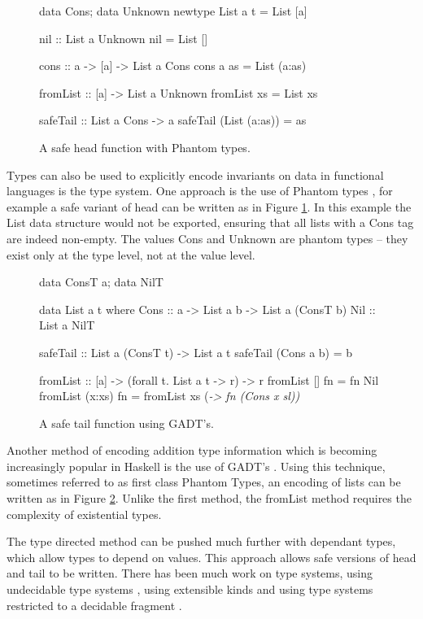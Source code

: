 \documentclass[preprint]{sigplanconf}
\newcommand{\C}[1]{\textsf{#1}}
\begin{document}
\begin{figure}
\begin{code}
data Cons; data Unknown
newtype List a t = List [a]

nil :: List a Unknown
nil = List []

cons :: a -> [a] -> List a Cons
cons a as = List (a:as)

fromList :: [a] -> List a Unknown
fromList xs = List xs

safeTail :: List a Cons -> a
safeTail (List (a:as)) = as
\end{code}
\caption{A safe \C{head} function with Phantom types.}
\label{fig:phantom}
\end{figure}

Types can also be used to explicitly encode invariants on data in functional languages is the type system. One approach is the use of Phantom types \citep{fluet:phantom}, for example a safe variant of \C{head} can be written as in Figure \ref{fig:phantom}. In this example the \C{List} data structure would not be exported, ensuring that all lists with a \C{Cons} tag are indeed non-empty. The values \C{Cons} and \C{Unknown} are phantom types -- they exist only at the type level, not at the value level.

\begin{figure}
\begin{code}
data ConsT a; data NilT

data List a t where
    Cons  :: a -> List a b -> List a (ConsT b)
    Nil   :: List a NilT

safeTail :: List a (ConsT t) -> List a t
safeTail (Cons a b) = b

fromList :: [a] -> (forall t. List a t -> r) -> r
fromList []      fn = fn Nil
fromList (x:xs)  fn = fromList xs (\sl -> fn (Cons x sl))
\end{code}
\caption{A safe \C{tail} function using GADT's.}
\label{fig:gadt}
\end{figure}

Another method of encoding addition type information which is becoming increasingly popular in Haskell is the use of GADT's \citep{spj:gadt}. Using this technique, sometimes referred to as first class Phantom Types, an encoding of lists can be written as in Figure \ref{fig:gadt}. Unlike the first method, the \C{fromList} method requires the complexity of existential types.

The type directed method can be pushed much further with dependant types, which allow types to depend on values. This approach allows safe versions of \C{head} and \C{tail} to be written. There has been much work on type systems, using undecidable type systems \citep{cayenne, epigram}, using extensible kinds \citep{omega} and using type systems restricted to a decidable fragment \citep{xi:dependent_practical}.
\end{document}
